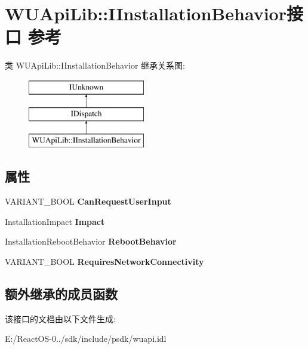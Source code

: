 \hypertarget{interface_w_u_api_lib_1_1_i_installation_behavior}{}\section{W\+U\+Api\+Lib\+:\+:I\+Installation\+Behavior接口 参考}
\label{interface_w_u_api_lib_1_1_i_installation_behavior}
类 W\+U\+Api\+Lib\+:\+:I\+Installation\+Behavior 继承关系图\+:\begin{figure}[H]
\begin{center}
\leavevmode
\includegraphics[height=3.000000cm]{interface_w_u_api_lib_1_1_i_installation_behavior}
\end{center}
\end{figure}
\subsection*{属性}
\begin{DoxyCompactItemize}
\item 
\mbox{\label{interface_w_u_api_lib_1_1_i_installation_behavior_a13ae2fe4db1e703f156b9cf71a52aea8}} 
V\+A\+R\+I\+A\+N\+T\+\_\+\+B\+O\+OL {\bfseries Can\+Request\+User\+Input}
\item 
\mbox{\label{interface_w_u_api_lib_1_1_i_installation_behavior_ae96d3e548f033c4343c9166b36368a5d}} 
Installation\+Impact {\bfseries Impact}
\item 
\mbox{\label{interface_w_u_api_lib_1_1_i_installation_behavior_a755600cb2e76b00e3a6ada4caa035174}} 
Installation\+Reboot\+Behavior {\bfseries Reboot\+Behavior}
\item 
\mbox{\label{interface_w_u_api_lib_1_1_i_installation_behavior_a5c48df74d8c5639f1163328a79391c3c}} 
V\+A\+R\+I\+A\+N\+T\+\_\+\+B\+O\+OL {\bfseries Requires\+Network\+Connectivity}
\end{DoxyCompactItemize}
\subsection*{额外继承的成员函数}


该接口的文档由以下文件生成\+:\begin{DoxyCompactItemize}
\item 
E\+:/\+React\+O\+S-\/0../sdk/include/psdk/wuapi.\+idl\end{DoxyCompactItemize}
